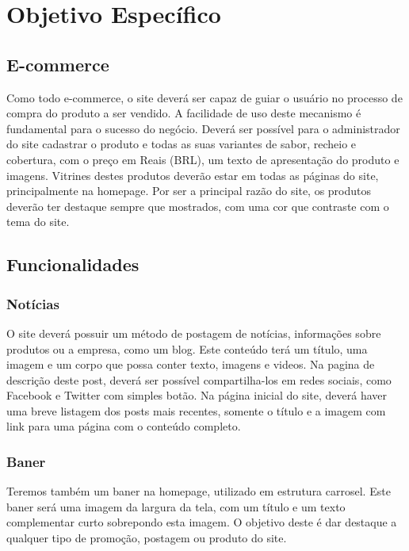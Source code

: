 \documentclass[
	12pt,				%
    oneside,			%
	a4paper,			%
	english,			%
	french,				%
	spanish,			%
	brazil				%
	]{abntex2}
\begin{document}
\section{Objetivo Específico}

\subsection{E-commerce}

Como todo e-commerce, o site deverá ser capaz de guiar o usuário no processo de compra do produto a ser vendido. A facilidade de uso deste mecanismo é fundamental para o sucesso do negócio. Deverá ser possível para o administrador do site cadastrar o produto e todas as suas variantes de sabor, recheio e cobertura, com o preço em Reais (BRL), um texto de apresentação do produto e imagens. Vitrines destes produtos deverão estar em todas as páginas do site, principalmente na homepage. Por ser a principal razão do site, os produtos deverão ter destaque sempre que mostrados, com uma cor que contraste com o tema do site.

\subsection{Funcionalidades}

\subsubsection{Notícias}
O site deverá possuir um método de postagem de notícias, informações sobre produtos ou a empresa, como um blog.
Este conteúdo terá um título, uma imagem e um corpo que possa conter texto, imagens e videos. Na pagina de descrição deste post, deverá ser possível compartilha-los em redes sociais, como Facebook e Twitter com simples botão. Na página inicial do site, deverá haver uma breve listagem dos posts mais recentes, somente o título e a imagem com link para uma página com o conteúdo completo.

\subsubsection{Baner}
Teremos também um baner na homepage, utilizado em estrutura carrosel. Este baner será uma imagem da largura da tela, com um título e um texto complementar curto sobrepondo esta imagem. O objetivo deste é dar destaque a qualquer tipo de promoção, postagem ou produto do site.
\end{document}
